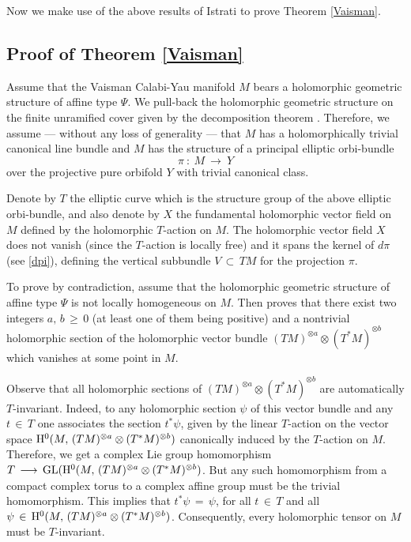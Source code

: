 \documentclass[12pt,reqno]{amsart}
\theoremstyle{definition}
\numberwithin{equation}{section}
\begin{document}
Now we make use of the above results of Istrati \cite{Is} to prove Theorem \ref{Vaisman}.

\subsection {Proof of Theorem \ref{Vaisman}}\label{seva}

Assume that the Vaisman Calabi-Yau manifold $M$ bears a holomorphic geometric structure of affine type 
$\Psi$. We pull-back the holomorphic geometric structure on the finite unramified cover given by the 
decomposition theorem \cite[Theorem D]{Is}. Therefore, we assume --- without any loss of generality --- 
that $M$ has a holomorphically trivial canonical line bundle and $M$ has the structure of a principal 
elliptic orbi-bundle
\begin{equation}\label{dpi}
\pi\ :\ M \ \longrightarrow\ Y
\end{equation}
over the projective pure orbifold $Y$ with trivial canonical class.

Denote by $T$ the elliptic curve which is the structure group of the above elliptic orbi-bundle, and also 
denote by $X$ the fundamental holomorphic vector field on $M$ defined by the holomorphic $T$-action on $M$. 
The holomorphic vector field $X$ does not vanish (since the $T$-action is locally free) and it spans the 
kernel of $d \pi$ (see \eqref{dpi}), defining the vertical subbundle $V \,\subset\, TM$ for the projection 
$\pi$.

To prove by contradiction, assume that the holomorphic geometric structure of affine type $\Psi$ is not 
locally homogeneous on $M$. Then \cite[Lemma 3.2]{Du} proves that there exist two integers $a,\,b \,\geq\, 0$ (at 
least one of them being positive) and a nontrivial holomorphic section of the holomorphic vector bundle 
$(TM)^{\otimes a}\otimes (T^*M)^{\otimes b}$ which vanishes at some point in $M$.

Observe that all holomorphic sections of $(TM)^{\otimes a} \otimes (T^*M)^{\otimes b}$ are automatically 
$T$-invariant. Indeed, to any holomorphic section $\psi$ of this vector bundle and any $t \,\in\, T$ one 
associates the section ${t^*} \psi$, given by the linear $T$-action on the vector space ${\rm H}^0(M,\, 
(TM)^{\otimes a} \otimes (T^*M)^{\otimes b})$ canonically induced by the $T$-action on $M$. Therefore, we 
get a complex Lie group homomorphism $T \,\longrightarrow \, {\rm GL}({\rm H}^0(M,\, (TM)^{\otimes a} 
\otimes (T^*M)^{\otimes b})$. But any such homomorphism from a compact complex torus to a complex affine 
group must be the trivial homomorphism. This implies that $t^*\psi\,=\,\psi$, for all $t \,\in\, T$ and all 
$\psi\,\in\, {\rm H}^0(M,\, (TM)^{\otimes a}\otimes(T^*M)^{\otimes b})$. Consequently, every holomorphic 
tensor on $M$ must be $T$-invariant.
\end{document}
